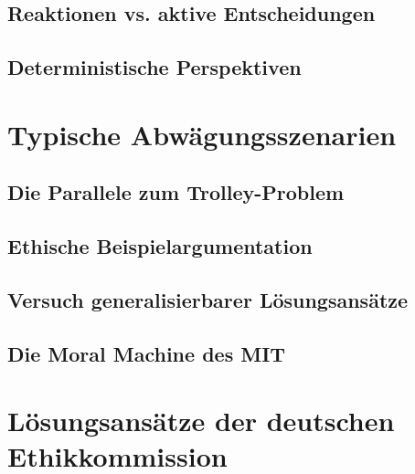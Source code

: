 \documentclass[twocolumn, german]{tum-article}
\begin{document}
\subsection{Reaktionen vs. aktive Entscheidungen}
\subsection{Deterministische Perspektiven}

\section{Typische Abwägungsszenarien}
\subsection{Die Parallele zum Trolley-Problem}
\subsection{Ethische Beispielargumentation}
\subsection{Versuch generalisierbarer Lösungsansätze}
\subsection{Die Moral Machine des MIT}

\section{Lösungsansätze der deutschen Ethikkommission}



\printbibliography
\end{document}
